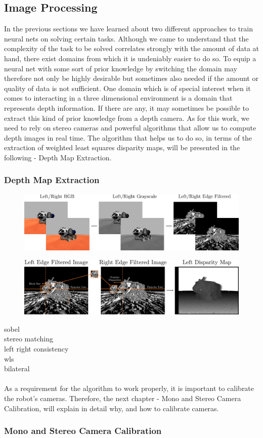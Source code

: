 \subsection{Image Processing}
In the previous sections we have learned about two different approaches to train neural nets on solving certain tasks. Although we came to understand that the complexity of the task to be solved correlates strongly with the amount of data at hand, there exist domains from which it is undeniably easier to do so. To equip a neural net with some sort of prior knowledge by switching the domain may therefore not only be highly desirable but sometimes also needed if the amount or quality of data is not sufficient. One domain which is of special interest when it comes to interacting in a three dimensional environment is a domain that represents depth information. If there are any, it may sometimes be possible to extract this kind of prior knowledge from a depth camera. As for this work, we need to rely on stereo cameras and powerful algorithms that allow us to compute depth images in real time. The algorithm that helps us to do so, in terms of the extraction of weighted least squares disparity maps, will be presented in the following - Depth Map Extraction.
\subsubsection{Depth Map Extraction}
\begin{figure}[h]
	\centering
	\includegraphics[scale=.25]{chapters/03_background/img/image_preprocessing.png}
	\caption{}
	\label{fig::323_image_preprocessing}
\end{figure}
\begin{figure}[h]
	\centering
	\includegraphics[scale=.3]{chapters/03_background/img/left_disparity_map.png}
	\caption{}
	\label{fig::323_left_disparity_map}
\end{figure}
\cite{sobel2014an}   sobel\\
\cite{hamzah2010sum} stereo matching\\
\cite{egnal2004stereo} left right consistency\\
\cite{min2014fast}   wls\\
\cite{tomasi1998bilateral} bilateral
\\\\
As a requirement for the algorithm to work properly, it is important to calibrate the robot's cameras. Therefore, the next chapter - Mono and Stereo Camera Calibration, will explain in detail why, and how to calibrate cameras.
\subsubsection{Mono and Stereo Camera Calibration}